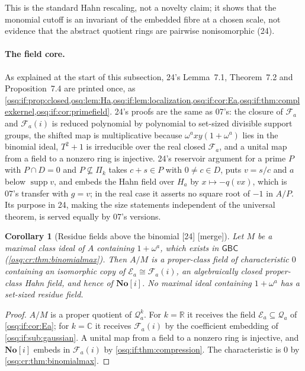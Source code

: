 \documentclass[11pt,letterpaper]{article}
\numberwithin{equation}{section}
\newtheorem{corollary}[corollary]{Corollary}
\theoremstyle{definition}
\theoremstyle{remark}
\theoremstyle{plain}
\newcommand{\No}{\mathbf{No}}
\newcommand{\SC}{\No[i]}
\newcommand{\R}{\mathbb R}
\newcommand{\C}{\mathbb C}
\newcommand{\FF}{\mathscr F}         %
\newcommand{\EE}{\mathscr E}         %
\newcommand{\Qa}{\mathcal Q}         %
\newcommand{\supp}{\operatorname{supp}}
\newcommand{\src}[1]{\textup{\textsf{[#1]}}}
\newcommand{\merge}{\textup{\textsf{[merge]}}}
\begin{document}
This is the standard Hahn rescaling, not a novelty claim; it shows that the monomial cutoff is an invariant of the embedded fibre at a chosen scale,
not evidence that the abstract quotient rings are pairwise nonisomorphic (24).

\paragraph{The field core.} As explained at the start of this subsection, 24's Lemma~7.1, Theorem~7.2 and Proposition~7.4 are printed once, as
\cref{osq:if:prop:closed,osq:lem:Ha,osq:if:lem:localization,osq:if:cor:Ea,osq:if:thm:complexkernel,osq:if:cor:primefield}. 24's proofs are the same as
07's: the closure of $\FF_a$ and $\FF_a(i)$ is reduced polynomial by polynomial to set-sized divisible support groups, the shifted map is multiplicative
because $\omega^axy(1+\omega^a)$ lies in the binomial ideal, $T^2+1$ is irreducible over the real closed $\FF_a$, and a unital map from a field to a nonzero
ring is injective. 24's reservoir argument for a prime $P$ with $P\cap D=0$ and $P\not\subseteq\Pi_k$ takes $c+s\in P$ with $0\ne c\in D$, puts $v=s/c$ and
$a$ below $\supp v$, and embeds the Hahn field over $H_a$ by $x\mapsto-q(vx)$, which is 07's transfer with $g=v$; in the real case it asserts no square
root of $-1$ in $A/P$. Its purpose in 24, making the size statements independent of the universal theorem, is served equally by 07's versions.

\begin{corollary}[Residue fields above the binomial \src{24} \merge]\label{osq:cr:cor:properfield}
Let $M$ be a maximal class ideal of $A$ containing $1+\omega^a$, which exists in $\mathsf{GBC}$ (\cref{osq:cr:thm:binomialmax}). Then $A/M$ is a
proper-class field of characteristic $0$ containing an isomorphic copy of $\EE_a\cong\FF_a(i)$, an algebraically closed proper-class Hahn field, and hence
of $\SC$. No maximal ideal containing $1+\omega^a$ has a set-sized residue field.
\end{corollary}
\begin{proof}
$A/M$ is a proper quotient of $\Qa^k_a$. For $k=\R$ it receives the field $\EE_a\subseteq\Qa_a$ of \cref{osq:if:cor:Ea}; for $k=\C$ it receives
$\FF_a(i)$ by the coefficient embedding of \cref{osq:if:sub:gaussian}. A unital map from a field to a nonzero ring is injective, and $\SC$ embeds in
$\FF_a(i)$ by \cref{osq:if:thm:compression}. The characteristic is $0$ by \cref{osq:cr:thm:binomialmax}.
\end{proof}
\end{document}
